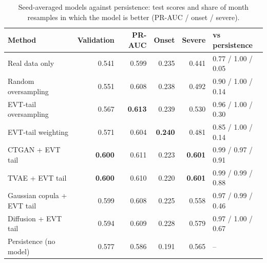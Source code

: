 \documentclass[11pt,a4paper]{article}
\begin{document}
\begin{table}[H]
\centering\small
\caption{Seed-averaged models against persistence: test scores and share of month resamples in which the model
is better (PR-AUC / onset / severe).}\label{tab:step13pers}
\begin{tabular}{@{}lrrrrl@{}}
\toprule
Method & Validation & PR-AUC & Onset & Severe & vs persistence\\
\midrule
Real data only & 0.541 & 0.599 & 0.235 & 0.441 & 0.77 / 1.00 / 0.05\\
Random oversampling & 0.551 & 0.608 & 0.238 & 0.492 & 0.90 / 1.00 / 0.14\\
EVT-tail oversampling & 0.567 & \textbf{0.613} & 0.239 & 0.530 & 0.96 / 1.00 / 0.30\\
EVT-tail weighting & 0.571 & 0.604 & \textbf{0.240} & 0.481 & 0.85 / 1.00 / 0.14\\
CTGAN + EVT tail & \textbf{0.600} & 0.611 & 0.223 & \textbf{0.601} & 0.99 / 0.97 / 0.91\\
TVAE + EVT tail & \textbf{0.600} & 0.610 & 0.220 & \textbf{0.601} & 0.99 / 0.99 / 0.88\\
Gaussian copula + EVT tail & 0.599 & 0.608 & 0.225 & 0.558 & 0.97 / 0.99 / 0.46\\
Diffusion + EVT tail & 0.594 & 0.609 & 0.228 & 0.579 & 0.97 / 1.00 / 0.67\\
\midrule
Persistence (no model) & 0.577 & 0.586 & 0.191 & 0.565 & --\\
\bottomrule
\end{tabular}
\end{table}
\end{document}
